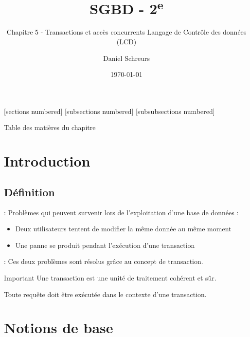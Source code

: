 \documentclass[10pt]{beamer}
\title{SGBD - 2\textsuperscript{e}}
\subtitle{Chapitre 5 - Transactions et accès concurrents Langage de Contrôle des données (LCD)}
\date{\today}
\author{Daniel Schreurs}
\institute{Haute École de la Province de Liège}
\begin{document}
\maketitle

[sections numbered]
[subsections numbered]
[subsubsections numbered]
\begin{frame}[allowframebreaks]{Table des matières du chapitre}
    \tableofcontents[subsectionstyle=show/show/hide,subsubsectionstyle=show/show/hide,]
\end{frame}

\section{Introduction}
\tocss
\subsection{Définition}
\begin{frame}{\secname : \subsecname}
    Problèmes qui peuvent survenir lors de l'exploitation d'une base de données :
    \begin{itemize}
        \item Deux utilisateurs tentent de modifier la même donnée au même moment
        \item Une panne se produit pendant l'exécution d'une transaction
    \end{itemize}
\end{frame}

\begin{frame}{\secname : \subsecname}
    Ces deux problèmes sont résolus grâce au concept de transaction.
    \begin{alertblock}{Important}
        Une transaction est une unité de traitement cohérent et sûr.
    \end{alertblock}
    Toute requête doit être exécutée dans le contexte d'une transaction.
\end{frame}
\section{Notions de base}
\tocss
\end{document}
